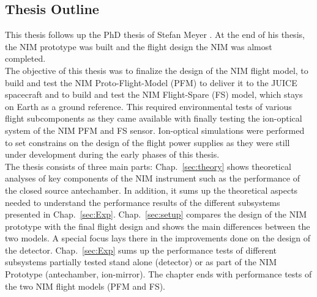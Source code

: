 	\subsection{Thesis Outline}
	This thesis follows up the PhD thesis of Stefan Meyer \cite{Diss_Meyer}. At the end of his thesis, the NIM prototype was built and the flight design the NIM was almost completed.\\	
	The objective of this thesis was to finalize the design of the NIM flight model, to build and test the NIM Proto-Flight-Model (PFM) to deliver it to the JUICE spacecraft and to build and test the NIM Flight-Spare (FS) model, which stays on Earth as a ground reference. This required environmental tests of various flight subcomponents as they came available with finally testing the ion-optical system of the NIM PFM and FS sensor. Ion-optical simulations were performed to set constrains on the design of the flight power supplies as they were still under development during the early phases of this thesis.\\
	The thesis consists of three main parts: Chap.~\ref{sec:theory} shows theoretical analyses of key components of the NIM instrument such as the performance of the closed source antechamber. In addition, it sums up the theoretical aspects needed to understand the performance results of the different subsystems presented in Chap.~\ref{sec:Exp}. Chap.~\ref{sec:setup} compares the design of the NIM prototype with the final flight design and shows the main differences between the two models. A special focus lays there in the improvements done on the design of the detector. Chap.~\ref{sec:Exp} sums up the performance tests of different subsystems partially tested stand alone (detector) or as part of the NIM Prototype (antechamber, ion-mirror). The chapter ends with performance tests of the two NIM flight models (PFM and FS).
	
